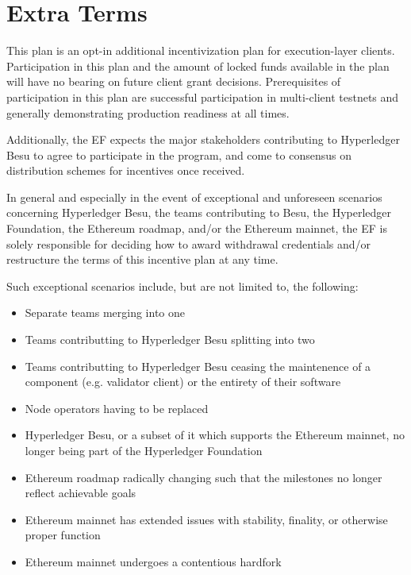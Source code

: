 
\section{Extra Terms} \label{sec:terms}
This plan is an opt-in additional incentivization plan for execution-layer clients. Participation in this plan and the amount of locked funds available in the plan will have no bearing on future client grant decisions. Prerequisites of participation in this plan are successful participation in multi-client testnets and generally demonstrating production readiness at all times.

Additionally, the EF expects the major stakeholders contributing to Hyperledger Besu to agree to participate in the program, and come to consensus on distribution schemes for incentives once received.

In general and especially in the event of exceptional and unforeseen scenarios concerning Hyperledger Besu, the teams contributing to Besu, the Hyperledger Foundation, the Ethereum roadmap, and/or the Ethereum mainnet, the EF is solely responsible for deciding how to award withdrawal credentials and/or restructure the terms of this incentive plan at any time.

Such exceptional scenarios include, but are not limited to, the following:

\begin{itemize}
\item Separate teams merging into one
\item Teams contributting to Hyperledger Besu splitting into two
\item Teams contributting to Hyperledger Besu ceasing the maintenence of a component (e.g. validator client) or the entirety of their software
\item Node operators having to be replaced
\item Hyperledger Besu, or a subset of it which supports the Ethereum mainnet, no longer being part of the Hyperledger Foundation
\item Ethereum roadmap radically changing such that the milestones no longer reflect achievable goals
\item Ethereum mainnet has extended issues with stability, finality, or otherwise proper function
\item Ethereum mainnet undergoes a contentious hardfork
\end{itemize}